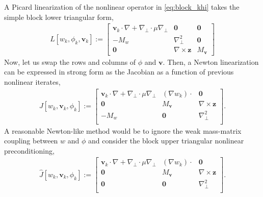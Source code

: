 \documentclass[review]{siamart}
\begin{document}
A Picard linearization of the nonlinear operator in \eqref{eq:block_khi} takes
the simple block lower triangular form,
%
\begin{align}\label{eq:dae_pic}
L[w_k,\phi_k,\mathbf{v}_k] := 
	\begin{bmatrix} \mathbf{v}_k\cdot\nabla + \nabla_\perp \cdot\mu\nabla_\perp &
		\mathbf{0} & \mathbf{0} \\
	-M_w &  \nabla_\perp^2 & \mathbf{0} \\ \mathbf{0} & \nabla\times \mathbf{z} & M_{\mathbf{v}}
\end{bmatrix}
\end{align}
%
Now, let us swap the rows and columns of $\phi$ and $\mathbf{v}$. Then, a
Newton linearization can be expressed in strong form as the Jacobian as a
function of previous nonlinear iterates,
%
\begin{align*}
J[w_k,\mathbf{v}_k, \phi_k] := 
	\begin{bmatrix} \mathbf{v}_k\cdot\nabla + \nabla_\perp \cdot\mu\nabla_\perp &
		(\nabla w_k)\cdot  & \mathbf{0} \\
	\mathbf{0} & M_{\mathbf{v}} & \nabla\times \mathbf{z} \\
	-M_w & \mathbf{0} & \nabla_\perp^2 \\ 
\end{bmatrix}.
\end{align*}
%
A reasonable Newton-like method would be to ignore the weak mass-matrix
coupling between $w$ and $\phi$ and consider the block upper triangular
nonlinear preconditioning,
%
\begin{align}\label{eq:dae_jac}
\widehat{J}[w_k,\mathbf{v}_k, \phi_k] := 
	\begin{bmatrix} \mathbf{v}_k\cdot\nabla + \nabla_\perp \cdot\mu\nabla_\perp &
		(\nabla w_k)\cdot  & \mathbf{0} \\
	\mathbf{0} & M_{\mathbf{v}} & \nabla\times \mathbf{z} \\
	\mathbf{0} & \mathbf{0} & \nabla_\perp^2 \\ 
\end{bmatrix}.
\end{align}
%
\end{document}
